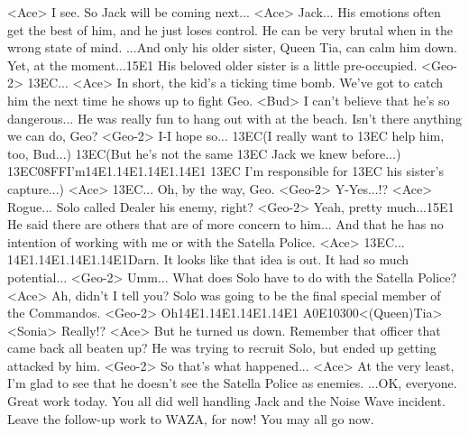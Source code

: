 <Ace> I see. 
So Jack will be coming next... 
<Ace> Jack... 
His emotions often get the best of him, and he just loses control. 
He can be very brutal when in the wrong state of mind. 
...And only his older sister, Queen Tia, can calm him down. 
Yet, at the moment...{15}{E1} His beloved older sister is a little pre-occupied. 
<Geo-2> {13}{EC}... 
<Ace> In short, the kid's a ticking time bomb. 
We've got to catch him the next time he shows up to fight Geo. 
<Bud> I can't believe that he's so dangerous... 
He was really fun to hang out with at the beach. 
Isn't there anything we can do, Geo? 
<Geo-2> I-I hope so... 
{13}{EC}(I really want to {13}{EC} help him, too, Bud...) 
{13}{EC}(But he's not the same {13}{EC} Jack we knew before...) 
{13}{EC}{08}{FF}I'm{14}{E1}.{14}{E1}.{14}{E1}.{14}{E1} {13}{EC} I'm responsible for {13}{EC} his sister's capture...) 
<Ace> {13}{EC}... 
Oh, by the way, Geo. 
<Geo-2> Y-Yes...!? 
<Ace> Rogue... 
Solo called Dealer his enemy, right? 
<Geo-2> Yeah, pretty much...{15}{E1} 
He said there are others that are of more concern to him... 
And that he has no intention of working with me or with the Satella Police. 
<Ace> {13}{EC}... 
{14}{E1}.{14}{E1}.{14}{E1}.{14}{E1}Darn. It looks like that idea is out. 
It had so much potential... 
<Geo-2> Umm... 
What does Solo have to do with the Satella Police? 
<Ace> Ah, didn't I tell you? 
Solo was going to be the final special member of the Commandos. 
<Geo-2> Oh{14}{E1}.{14}{E1}.{14}{E1}.{14}{E1} 
{A0}{E1}{03}{00}<(Queen)Tia> 
<Sonia> Really!? 
<Ace> But he turned us down. 
Remember that officer that came back all beaten up? 
He was trying to recruit Solo, but ended up getting attacked by him. 
<Geo-2> So that's what happened... 
<Ace> At the very least, I'm glad to see that he doesn't see the Satella Police as enemies. 
...OK, everyone. 
Great work today. 
You all did well handling Jack and the Noise Wave incident. 
Leave the follow-up work to WAZA, for now! 
You may all go now. 
